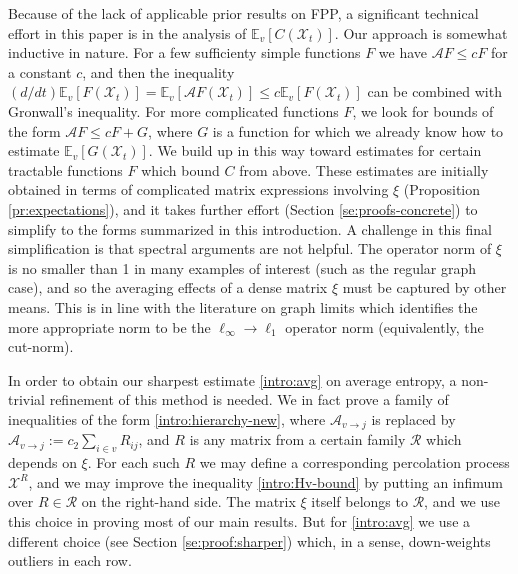 \documentclass[11pt,reqno]{amsart}
\numberwithin{equation}{section}
\theoremstyle{definition}
\def\CC{{C}}
\def\A{{\mathcal A}}
\def\E{{\mathbb E}}
\def\X{{\mathcal X}}
\begin{document}
Because of the lack of applicable prior results on FPP, a significant technical effort in this paper is in the analysis of $\E_v[\CC(\X_t)]$.
Our approach is somewhat inductive in nature. For a few sufficienty simple functions $F$ we have $\A F \le cF$ for a constant $c$, and then the inequality $(d/dt)\E_v[F(\X_t)]=\E_v[\A F(\X_t)] \le c\E_v[F(\X_t)]$ can be combined  with Gronwall's inequality.
For more complicated functions $F$, we look for bounds of the form $\A F \le cF + G$, where  $G$ is a function for which we already know how to estimate $\E_v[G(\X_t)]$.
We build up in this way toward estimates for certain tractable functions $F$ which bound $\CC$ from above.
These estimates are initially obtained in terms of complicated matrix expressions involving $\xi$ (Proposition \ref{pr:expectations}), and it takes further effort (Section \ref{se:proofs-concrete}) to simplify to the forms summarized in this introduction. A challenge in this final simplification is that spectral arguments are not helpful. The operator norm of $\xi$ is no smaller than 1 in many examples of interest (such as the regular graph case), and so the averaging effects of a dense matrix $\xi$ must be captured by other means. This is in line with the literature on graph limits which identifies the more appropriate norm to be the $\ell_\infty\to\ell_1$ operator norm (equivalently, the cut-norm).

In order to obtain our sharpest estimate \eqref{intro:avg} on average entropy, a non-trivial refinement of this method is needed. We in fact prove a family of inequalities of the form \eqref{intro:hierarchy-new}, where $\A_{v\to j}$ is replaced by $\A_{v\to j} := c_2\sum_{i \in v}R_{ij}$, and $R$ is any matrix from a certain family $\mathcal{R}$ which depends on $\xi$. For each such $R$ we may define a corresponding percolation process $\X^R$, and we may improve the inequality \eqref{intro:Hv-bound} by putting an infimum over $R \in \mathcal{R}$ on the right-hand side. The matrix $\xi$ itself  belongs to $\mathcal{R}$, and we use this choice in proving most of our main results. But for \eqref{intro:avg} we use a different choice (see Section \ref{se:proof:sharper}) which, in a sense, down-weights outliers in each row. 
\end{document}
